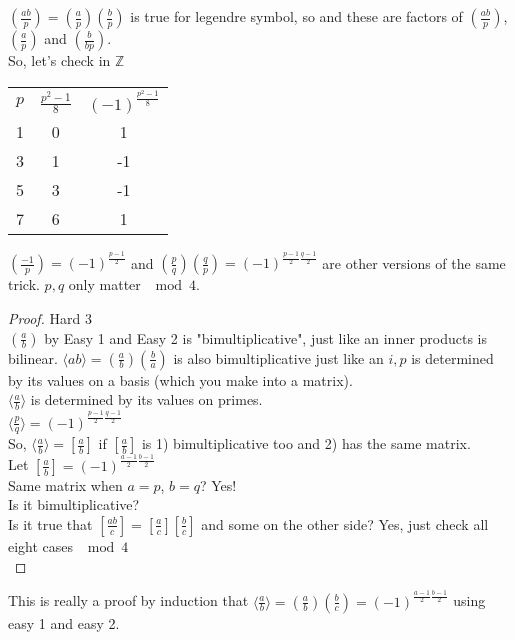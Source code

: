     $(\frac{ab}{p}) = (\frac{a}{p})(\frac{b}{p})$ is true for legendre symbol,
    so and these are factors of $(\frac{ab}{p})$, $(\frac{a}{p})$ and 
    $(\frac{b}{bp})$.\\
    So, let's check in $\mathbb{Z}$\\
    \begin{tabular}{c |c |c}
      $p$ & $\frac{p^2 - 1}{8}$ & $(-1)^{\frac{p^2 - 1}{8}}$\\
      1 & 0 & 1\\
      3 & 1 & -1\\
      5 & 3 & -1\\
      7 & 6 & 1\\
    \end{tabular}
    $(\frac{-1}{p}) = (-1)^{\frac{p-1}{2}}$ and $(\frac{p}{q})
    (\frac{q}{p}) = (-1)^{\frac{p-1}{2}\frac{q-1}{2}}$ are other
    versions of the same trick. $p,q$ only matter $\mod 4$.\\
    \begin{proof} Hard 3\\
      $(\frac{a}{b})$ by Easy 1 and Easy 2 is "bimultiplicative", just like an
      inner products is bilinear. $\langle{a}{b}\rangle = (\frac{a}{b})
      (\frac{b}{a})$ is also bimultiplicative just like an $i,p$ is determined 
      by its values on a basis (which you make into a matrix).\\
      $\langle\frac{a}{b}\rangle$ is determined by its values on primes.\\
      $\langle\frac{p}{q}\rangle = (-1)^{\frac{p-1}{2}\frac{q-1}{2}}$\\
      So, $\langle\frac{a}{b}\rangle = \left[ \frac{a}{b} \right]$ if
      $\left[ \frac{a}{b} \right]$ is 1) bimultiplicative too and 2) has
      the same matrix.\\
      Let $\left[ \frac{a}{b} \right] = (-1)^{\frac{a-1}{2} \frac{b-1}{2}}$\\
      Same matrix when $a = p$, $b = q$? Yes!\\
      Is it bimultiplicative? \\
        Is it true that $\left[\frac{ab}{c}\right] = \left[\frac{a}{c}\right]
        \left[\frac{b}{c}\right]$ and some on the other side? Yes, just 
        check all eight cases $\mod 4$\\
    \end{proof}
    This is really a proof by induction that $\langle\frac{a}{b}\rangle =
    (\frac{a}{b})(\frac{b}{c}) = (-1)^{\frac{a-1}{2}\frac{b-1}{2}}$ using
    easy 1 and easy 2.\\
